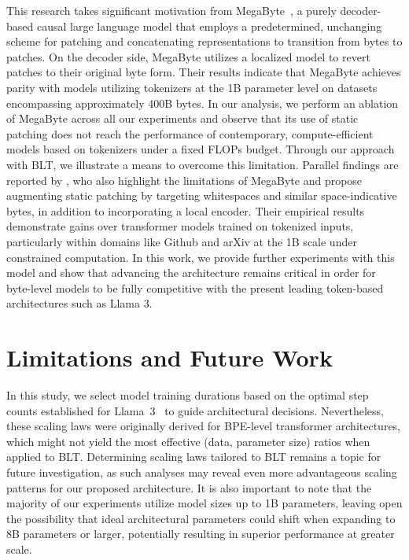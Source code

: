 This research takes significant motivation from MegaByte~\citep{yu2023megabyte}, a purely decoder-based causal large language model that employs a predetermined, unchanging scheme for patching and concatenating representations to transition from bytes to patches. On the decoder side, MegaByte utilizes a localized model to revert patches to their original byte form. Their results indicate that MegaByte achieves parity with models utilizing tokenizers at the 1B parameter level on datasets encompassing approximately 400B bytes. In our analysis, we perform an ablation of MegaByte across all our experiments and observe that its use of static patching does not reach the performance of contemporary, compute-efficient models based on tokenizers under a fixed FLOPs budget. Through our approach with {\textsc BLT}, we illustrate a means to overcome this limitation. Parallel findings are reported by \cite{slagle2024spacebyte}, who also highlight the limitations of MegaByte and propose augmenting static patching by targeting whitespaces and similar space-indicative bytes, in addition to incorporating a local encoder. Their empirical results demonstrate gains over transformer models trained on tokenized inputs, particularly within domains like Github and arXiv at the 1B scale under constrained computation. In this work, we provide further experiments with this model and show that advancing the architecture remains critical in order for byte-level models to be fully competitive with the present leading token-based architectures such as Llama 3.

\section{Limitations and Future Work}

In this study, we select model training durations based on the optimal step counts established for Llama~3~\citep{dubey2024llama} to guide architectural decisions. Nevertheless, these scaling laws were originally derived for BPE-level transformer architectures, which might not yield the most effective (data, parameter size) ratios when applied to {\textsc BLT}. Determining scaling laws tailored to {\textsc BLT} remains a topic for future investigation, as such analyses may reveal even more advantageous scaling patterns for our proposed architecture. It is also important to note that the majority of our experiments utilize model sizes up to 1B parameters, leaving open the possibility that ideal architectural parameters could shift when expanding to 8B parameters or larger, potentially resulting in superior performance at greater scale.

